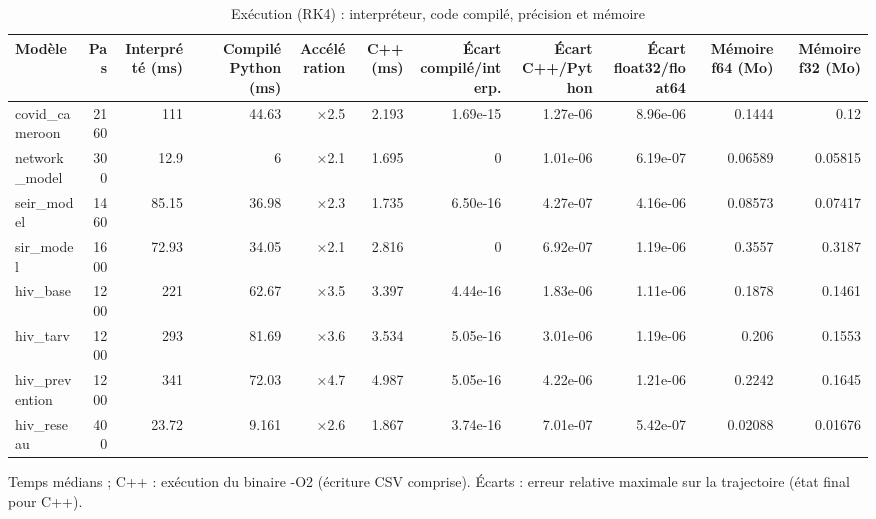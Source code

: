\begin{table}[htbp]
\centering
\small
\caption{Exécution (RK4) : interpréteur, code compilé, précision et mémoire}
\label{tab:bench-b2}
\begin{tabular}{lrrrrrrrrrr}
\toprule
Modèle & Pas & Interprété (ms) & Compilé Python (ms) & Accélération & C++ (ms) & Écart compilé/interp. & Écart C++/Python & Écart float32/float64 & Mémoire f64 (Mo) & Mémoire f32 (Mo) \\
\midrule
covid\_cameroon & 2160 & 111 & 44.63 & ×2.5 & 2.193 & 1.69e-15 & 1.27e-06 & 8.96e-06 & 0.1444 & 0.12 \\
network\_model & 300 & 12.9 & 6 & ×2.1 & 1.695 & 0 & 1.01e-06 & 6.19e-07 & 0.06589 & 0.05815 \\
seir\_model & 1460 & 85.15 & 36.98 & ×2.3 & 1.735 & 6.50e-16 & 4.27e-07 & 4.16e-06 & 0.08573 & 0.07417 \\
sir\_model & 1600 & 72.93 & 34.05 & ×2.1 & 2.816 & 0 & 6.92e-07 & 1.19e-06 & 0.3557 & 0.3187 \\
hiv\_base & 1200 & 221 & 62.67 & ×3.5 & 3.397 & 4.44e-16 & 1.83e-06 & 1.11e-06 & 0.1878 & 0.1461 \\
hiv\_tarv & 1200 & 293 & 81.69 & ×3.6 & 3.534 & 5.05e-16 & 3.01e-06 & 1.19e-06 & 0.206 & 0.1553 \\
hiv\_prevention & 1200 & 341 & 72.03 & ×4.7 & 4.987 & 5.05e-16 & 4.22e-06 & 1.21e-06 & 0.2242 & 0.1645 \\
hiv\_reseau & 400 & 23.72 & 9.161 & ×2.6 & 1.867 & 3.74e-16 & 7.01e-07 & 5.42e-07 & 0.02088 & 0.01676 \\
\bottomrule
\end{tabular}
\par\smallskip\footnotesize Temps médians ; C++ : exécution du binaire -O2 (écriture CSV comprise). Écarts : erreur relative maximale sur la trajectoire (état final pour C++).
\end{table}

